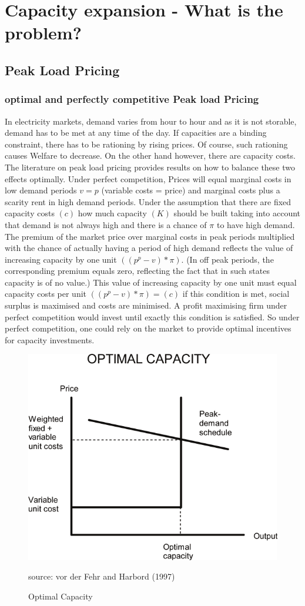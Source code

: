 \section{Capacity expansion - What is the problem?}

\subsection{Peak Load Pricing}

\subsubsection{optimal and perfectly competitive Peak load Pricing}

In electricity markets, demand varies from hour to hour and as it is not storable, demand has to be met at any time of the day. If capacities are a binding constraint, there has to be rationing by rising prices. Of course, such rationing causes Welfare to decrease. On the other hand however, there are capacity costs. The literature on peak load pricing provides results on how to balance these two effects optimally. Under perfect competition, Prices will equal marginal costs in low demand periods $v=p$ (variable costs = price) and marginal costs plus a scarity rent in high demand periods. Under the assumption that there are fixed capacity costs $(c)$ how much capacity $(K)$ should be built taking into account that demand is not always high and there is a chance of $\pi$ to have high demand. The premium of the market price over marginal costs in peak periods multiplied with the chance of actually having a period of high demand reflects the value of increasing capacity by one unit $((p^p-v)*\pi)$. (In off peak periods, the corresponding premium equals zero, reflecting the fact that in such states capacity is of no value.) This value of increasing capacity by one unit must equal capacity costs per unit $((p^p-v)*\pi)=(c)$ if this condition is met, social surplus is maximised and costs are minimised. A profit maximising firm under perfect competition would invest until exactly this condition is satisfied. So under perfect competition, one could rely on the market to provide optimal incentives for capacity investments.

\begin{figure}[h]
\centering
\includegraphics[width=.5\textwidth]{capacity/peak_load_opt}
      \label{peak_load_opt}
      \caption{Optimal Capacity}
      source: vor der Fehr and Harbord (1997)     
\end{figure}

